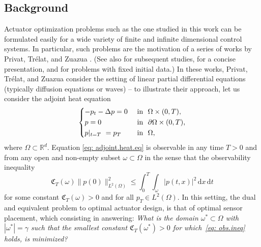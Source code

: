 \documentclass[11pt, a4paper, reqno]{amsart}
\newcommand{\diff}{\, \mathrm{d}}
\newcommand{\del}{\partial}
\newcommand{\R}{\mathbb{R}}
\theoremstyle{plain}
\numberwithin{equation}{section}
\begin{document}
	\subsection{Background}
	
	Actuator optimization problems such as the one studied in this work can be formulated easily for a wide variety of finite and infinite dimensional control systems. In particular, such problems are the motivation of a series of works by Privat, Trélat, and Zuazua \citep{privat2013optimal-b,privat2013optimal-a, privat2015optimal, privat2016optimal, privat2017actuator, privat2019spectral}. (See also \citep{gimperlein2017deterministic, bergounioux2019position} for subsequent studies, \citep{trelat2018optimal} for a concise presentation, and \citep{morris2010linear, kalise2018optimal} for problems with fixed initial data.) In these works, Privat, Trélat, and Zuazua consider the setting of linear partial differential equations (typically diffusion equations or waves) -- to illustrate their approach, let us consider the adjoint heat equation
	\begin{equation} \label{eq: adjoint.heat.eq}
	\begin{dcases}
	-p_t - \Delta p = 0 &\text{ in } \Omega \times (0,T), \\
	p = 0 &\text{ in } \del \Omega \times (0,T), \\
	p|_{t=T} = p_T &\text{ in } \Omega,
	\end{dcases}
	\end{equation}
	where $\Omega\subset\R^d$. 
	Equation \eqref{eq: adjoint.heat.eq} is observable in any time $T>0$ and from any open and non-empty subset $\omega\subset\Omega$ in the sense that the observability inequality
	\begin{equation} \label{eq: obs.ineq}
	\mathfrak{C}_T({\omega}) \|p(0)\|_{L^2(\Omega)}^2 \leqslant \int_0^T \int_\omega |p(t,x)|^2 \diff x \diff t 
	\end{equation}
	for some constant $\mathfrak{C}_T(\omega)>0$ and for all $p_T\in L^2(\Omega)$. In this setting, the dual and equivalent problem to optimal actuator design, is that of optimal sensor placement, which consisting in answering:
	\emph{What is the domain $\omega^*\subset\Omega$ with $|\omega^*|=\gamma$ such that the smallest constant $\mathfrak{C}_T({\omega^*})>0$ for which \eqref{eq: obs.ineq} holds, is minimized?}
	
\end{document}
